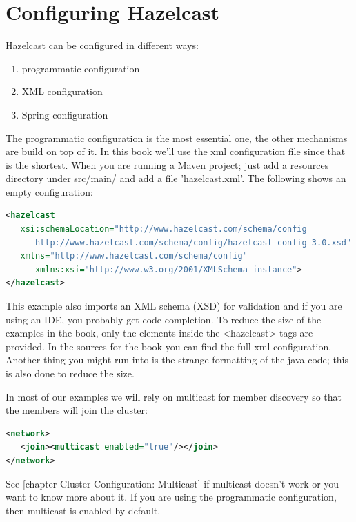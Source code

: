 \section{Configuring Hazelcast}
Hazelcast can be configured in different ways:
\begin{enumerate}
\item programmatic configuration
\item XML configuration 
\item Spring configuration
\end{enumerate}
The programmatic configuration is the most essential one, the other mechanisms are build on top of it. In this book we'll use the xml configuration file since that is the shortest. When you are running a Maven project; just add a resources directory under src/main/ and add a file 'hazelcast.xml'. The following shows an empty configuration:
\begin{lstlisting}[language=xml]
<hazelcast 
   xsi:schemaLocation="http://www.hazelcast.com/schema/config                               
      http://www.hazelcast.com/schema/config/hazelcast-config-3.0.xsd"
   xmlns="http://www.hazelcast.com/schema/config"
      xmlns:xsi="http://www.w3.org/2001/XMLSchema-instance">
</hazelcast>
\end{lstlisting}
This example also imports an XML schema (XSD) for validation and if you are using an IDE, you probably get code completion. To reduce the size of the examples in the book, only the elements inside the <hazelcast> tags are provided. In the sources for the book you can find the full xml configuration. Another thing you might run into is the strange formatting of the java code; this is also done to reduce the size. 

In most of our examples we will rely on multicast for member discovery so that the members will join the cluster:
\begin{lstlisting}[language=xml]
<network>
   <join><multicast enabled="true"/></join>
</network>
\end{lstlisting}
See [chapter Cluster Configuration: Multicast] if multicast doesn't work or you want to know more about it. If you are using the programmatic configuration, then multicast is enabled by default.

